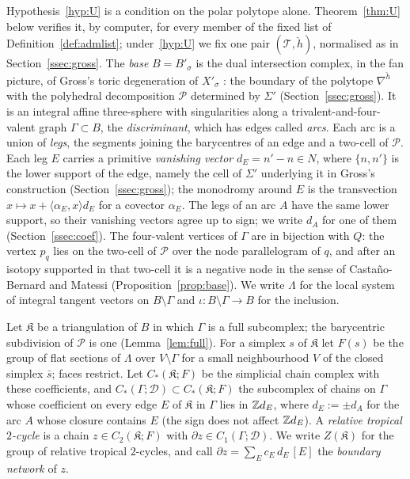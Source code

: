Hypothesis~\ref{hyp:U} is a condition on the polar polytope alone. Theorem~\ref{thm:U} below verifies it, by computer,
for every member of the fixed list of Definition~\ref{def:admlist}; under~\ref{hyp:U} we fix one pair
$(\mathcal T,\check h)$, normalised as in Section~\ref{ssec:gross}. The \emph{base} $B=B'_\sigma$ is the dual intersection complex, in the fan picture, of
Gross's toric degeneration of $X'_\sigma$ \cite{Gross2005}: the boundary of the polytope $\nabla^{\check h}$ with the
polyhedral decomposition $\mathscr P$ determined by $\Sigma'$ (Section~\ref{ssec:gross}). It is an integral affine
three-sphere with singularities along a trivalent-and-four-valent graph $\Gamma\subset B$, the \emph{discriminant}, which
has edges called \emph{arcs}. Each arc is a union of \emph{legs}, the segments joining the barycentres of an edge and
a two-cell of $\mathscr P$. Each leg $E$ carries a primitive \emph{vanishing vector} $d_E=n'-n\in N$, where
$\{n,n'\}$ is the lower support of the edge, namely the cell of $\Sigma'$ underlying it in Gross's construction
(Section~\ref{ssec:gross}); the
monodromy around $E$ is the transvection $x\mapsto x+\langle\alpha_E,x\rangle d_E$ for a covector $\alpha_E$. The legs
of an arc $A$ have the same lower support, so their vanishing vectors agree up to sign; we write $d_A$ for one of them
(Section~\ref{ssec:coef}). The
four-valent vertices of $\Gamma$ are in bijection with $Q$: the vertex $p_q$ lies on the two-cell of $\mathscr P$ over the
node parallelogram of $q$, and after an isotopy supported in that two-cell it is a negative node in the sense of
Casta\~no-Bernard and Matessi \cite[Def.~6.3]{CBM} (Proposition~\ref{prop:base}). We write $\Lambda$ for the local system of integral tangent vectors on $B\setminus\Gamma$ and
$\iota\colon B\setminus\Gamma\to B$ for the inclusion.

\begin{definition}\label{def:relcycle}
Let $\mathfrak K$ be a triangulation of $B$ in which $\Gamma$ is a full subcomplex; the barycentric subdivision of
$\mathscr P$ is one (Lemma~\ref{lem:full}). For a simplex $s$ of $\mathfrak K$ let $F(s)$ be the group of flat sections of
$\Lambda$ over $V\setminus\Gamma$ for a small neighbourhood $V$ of the closed simplex $\bar s$; faces restrict. Let
$C_*(\mathfrak K;F)$ be the simplicial chain complex with these coefficients, and $C_*(\Gamma;\mathcal D)\subset
C_*(\mathfrak K;F)$ the subcomplex of chains on $\Gamma$ whose coefficient on every edge $E$ of $\mathfrak K$ in $\Gamma$ lies in $\mathbb Z d_E$,
where $d_E:=\pm d_A$ for the arc $A$ whose closure contains $E$ (the sign does not affect $\mathbb Z d_E$). A
\emph{relative tropical $2$-cycle} is a chain $z\in C_2(\mathfrak K;F)$ with $\partial z\in C_1(\Gamma;\mathcal D)$. We
write $Z(\mathfrak K)$ for the group of relative tropical $2$-cycles, and call
$\partial z=\sum_Ec_E\,d_E\,[E]$ the \emph{boundary network} of $z$.
\end{definition}

